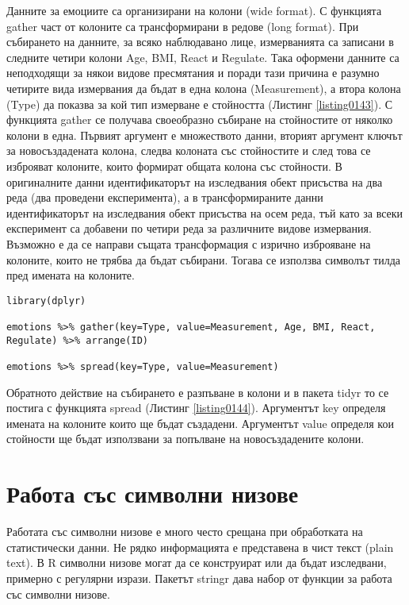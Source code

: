 Данните за емоциите са организирани на колони (wide format). С функцията gather част от колоните са трансформирани в редове (long format). При събирането на данните, за всяко наблюдавано лице, измерванията са записани в следните четири колони Age, BMI, React и Regulate. Така оформени данните са неподходящи за някои видове пресмятания и поради тази причина е разумно четирите вида измервания да бъдат в една колона (Measurement), а втора колона (Type) да показва за кой тип измерване е стойността (Листинг \ref{listing0143}). С функцията gather се получава своеобразно събиране на стойностите от няколко колони в една. Първият аргумент е множеството данни, вторият аргумент ключът за новосъздадената колона, следва колоната със стойностите и след това се изброяват колоните, които формират общата колона със стойности. В оригиналните данни идентификаторът на изследвания обект присъства на два реда (два проведени експеримента), а в трансформираните данни идентификаторът на изследвания обект присъства на осем реда, тъй като за всеки експеримент са добавени по четири реда за различните видове измервания. Възможно е да се направи същата трансформация с изрично изброяване на колоните, които не трябва да бъдат събирани. Тогава се използва символът тилда пред имената на колоните.

\begin{lstlisting}[caption=Разпъване от редове в колони, label=listing0144]
library(dplyr)

emotions %>% gather(key=Type, value=Measurement, Age, BMI, React, Regulate) %>% arrange(ID)

emotions %>% spread(key=Type, value=Measurement)
\end{lstlisting}

Обратното действие на събирането е разпъване в колони и в пакета tidyr то се постига с функцията spread (Листинг \ref{listing0144}). Аргументът key определя имената на колоните които ще бъдат създадени. Аргументът value определя кои стойности ще бъдат използвани за попълване на новосъздадените колони.

\section{Работа със символни низове}

Работата със символни низове е много често срещана при обработката на статистически данни. Не рядко информацията е представена в чист текст (plain text). В R символни низове могат да се конструират или да бъдат изследвани, примерно с регулярни изрази. Пакетът stringr дава набор от функции за работа със символни низове.

